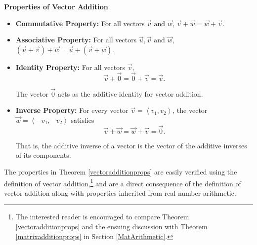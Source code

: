 \documentclass{ximera}
\begin{document}
\begin{theorem} \label{vectoradditionprops}  \textbf{Properties of Vector Addition} 
\begin{itemize}

\item  \textbf{Commutative Property:}  For all vectors $\overrightarrow{v} \text{ and } \overrightarrow{w}$, $\overrightarrow{v} + \overrightarrow{w} = \overrightarrow{w} + \overrightarrow{v}$. 

\item  \textbf{Associative Property:}  For all vectors $\overrightarrow{u}, \overrightarrow{v} \text{ and } \overrightarrow{w}$, $\left(\overrightarrow{u} + \overrightarrow{v}\right) + \overrightarrow{w} = \overrightarrow{u} + \left(\overrightarrow{v} + \overrightarrow{w}\right)$. 

\item  \textbf{Identity Property:}   For all vectors $\overrightarrow{v}$,  \[\overrightarrow{v} + \overrightarrow{0} = \overrightarrow{0} + \overrightarrow{v} = \overrightarrow{v}.\] 

The vector $\overrightarrow{0}$ acts as the additive identity for vector addition. 

\item  \textbf{Inverse Property:}   For every vector  $\overrightarrow{v} = \left< v_1, v_2 \right>$, the vector $\overrightarrow{w} = \left< - v_1, -v_2 \right>$ satisfies  \[\overrightarrow{v} + \overrightarrow{w} = \overrightarrow{w} + \overrightarrow{v} = \overrightarrow{0}.\] 

That is, the additive inverse of a vector is the vector of the additive inverses of its components.

\end{itemize}
\end{theorem}


The properties in Theorem \ref{vectoradditionprops} are easily verified using the definition of vector addition,\footnote{The interested reader is encouraged to compare Theorem \ref{vectoradditionprops} and the ensuing discussion with Theorem \ref{matrixadditionprops} in Section \ref{MatArithmetic}.}  and are a direct consequence of the definition of vector addition along with properties inherited from real number arithmetic.
\end{document}
